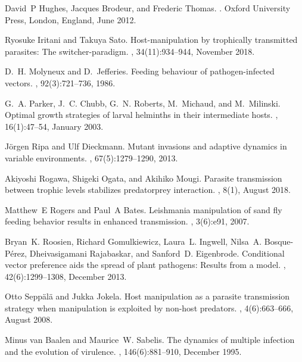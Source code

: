 \documentclass[11pt]{article}
\begin{document}
\begin{thebibliography}{10}
David~P Hughes, Jacques Brodeur, and Frederic Thomas.
.
\newblock Oxford University Press, London, England, June 2012.

Ryosuke Iritani and Takuya Sato.
\newblock Host-manipulation by trophically transmitted parasites: The
  switcher-paradigm.
, 34(11):934--944, November 2018.

D.~H. Molyneux and D.~Jefferies.
\newblock Feeding behaviour of pathogen-infected vectors.
, 92(3):721–736, 1986.

G.~A. Parker, J.~C. Chubb, G.~N. Roberts, M.~Michaud, and M.~Milinski.
\newblock Optimal growth strategies of larval helminths in their intermediate
  hosts.
, 16(1):47--54, January 2003.

Jörgen Ripa and Ulf Dieckmann.
\newblock Mutant invasions and adaptive dynamics in variable environments.
, 67(5):1279--1290, 2013.

Akiyoshi Rogawa, Shigeki Ogata, and Akihiko Mougi.
\newblock Parasite transmission between trophic levels stabilizes
  predator{\textendash}prey interaction.
, 8(1), August 2018.

Matthew~E Rogers and Paul~A Bates.
\newblock Leishmania manipulation of sand fly feeding behavior results in
  enhanced transmission.
, 3(6):e91, 2007.

Bryan~K. Roosien, Richard Gomulkiewicz, Laura~L. Ingwell, Nilsa~A.
  Bosque-P{\'{e}}rez, Dheivasigamani Rajabaskar, and Sanford~D. Eigenbrode.
\newblock Conditional vector preference aids the spread of plant pathogens:
  Results from a model.
, 42(6):1299--1308, December 2013.

Otto Sepp\"{a}l\"{a} and Jukka Jokela.
\newblock Host manipulation as a parasite transmission strategy when
  manipulation is exploited by non-host predators.
, 4(6):663--666, August 2008.

Minus van Baalen and Maurice~W. Sabelis.
\newblock The dynamics of multiple infection and the evolution of virulence.
, 146(6):881--910, December 1995.


\end{thebibliography}
\end{document}

